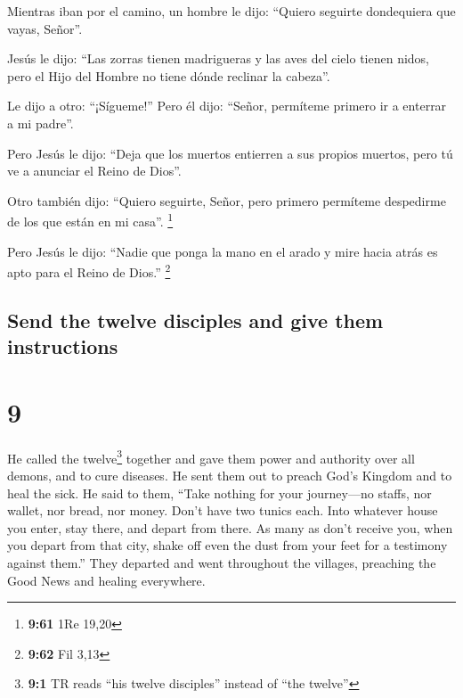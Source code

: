 \begin{paracol}{2}
 Mientras iban por el camino, un hombre le dijo: ``Quiero
seguirte dondequiera que vayas, Señor''.

 Jesús le dijo: ``Las zorras tienen madrigueras y las
aves del cielo tienen nidos, pero el Hijo del Hombre no tiene dónde
reclinar la cabeza''.

 Le dijo a otro: ``¡Sígueme!'' Pero él dijo: ``Señor,
permíteme primero ir a enterrar a mi padre''.

 Pero Jesús le dijo: ``Deja que los muertos entierren a
sus propios muertos, pero tú ve a anunciar el Reino de Dios''.

 Otro también dijo: ``Quiero seguirte, Señor, pero
primero permíteme despedirme de los que están en mi casa''. \footnote{\textbf{9:61}
  1Re 19,20}

 Pero Jesús le dijo: ``Nadie que ponga la mano en el
arado y mire hacia atrás es apto para el Reino de Dios.'' \footnote{\textbf{9:62}
  Fil 3,13}

\switchcolumn
\begin{otherlanguage}{english}

\hypertarget{send-the-twelve-disciples-and-give-them-instructions}{%
\subsection{Send the twelve disciples and give them
instructions}\label{send-the-twelve-disciples-and-give-them-instructions}}

\hypertarget{section-17}{%
\section{9}\label{section-17}}

 He called the twelve\footnote{\textbf{9:1} TR reads ``his
  twelve disciples'' instead of ``the twelve''} together and gave them
power and authority over all demons, and to cure diseases.
 He sent them out to preach God's Kingdom and to heal the
sick.  He said to them, ``Take nothing for your
journey---no staffs, nor wallet, nor bread, nor money. Don't have two
tunics each.  Into whatever house you enter, stay there,
and depart from there.  As many as don't receive you, when
you depart from that city, shake off even the dust from your feet for a
testimony against them.''  They departed and went
throughout the villages, preaching the Good News and healing everywhere.


\end{otherlanguage}
\end{paracol}
